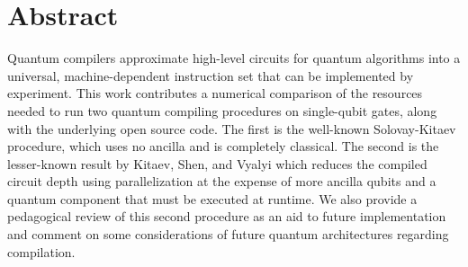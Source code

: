 \section{Abstract}

Quantum compilers approximate high-level circuits for quantum algorithms
into a universal, machine-dependent
instruction set that can be implemented by experiment. This work contributes
a numerical comparison of the
resources needed to run two quantum compiling procedures on single-qubit gates,
along with the underlying open source code.
The first is the well-known Solovay-Kitaev procedure, which uses no ancilla and
is completely classical. The second is the lesser-known result by Kitaev,
Shen, and Vyalyi which reduces the compiled
circuit depth using parallelization at the expense of more ancilla qubits and
a quantum component that must be executed at runtime.
We also provide a pedagogical review of this second procedure as an aid to
future implementation and comment on some considerations of future
quantum architectures regarding compilation.